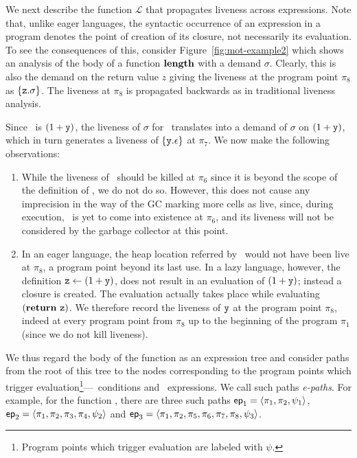 \documentclass[9pt]{sigplanconf}
\begin{document}
We next  describe the function $\mathcal{L}$  that propagates liveness
across expressions.  Note that,  unlike eager languages, the syntactic
occurrence  of an expression  in a  program denotes  the point  of
creation of its closure, not necessarily its evaluation.
To see the  consequences of this, consider
Figure~\ref{fig:mot-example2} which shows an analysis  of the body of
a function $\mathbf{length}$ with a demand $\sigma$.  Clearly, this is also the
demand on the return value $z$ giving the liveness at the program point
$\pi_8$ as $\{\mbox{\tt z}.\sigma\}$.  The liveness at $\pi_8$ is propagated
backwards as in traditional liveness analysis.

Since   \pz\  is   $(1  +   \mbox{\tt y})$,  the   liveness  of   $\sigma$  for
\pz\ translates into a demand  of $\sigma$ on $(1+\mbox{\tt y})$, which in turn
generates a  liveness of $\{\mbox{\tt y}.\epsilon\}$ at  $\pi_7$.  We now make
the following observations:
\begin{enumerate}
\item While the liveness of \py\  should be killed at $\pi_6$ since it
  is  beyond the scope  of the  definition of  \py, we  do not  do so.
  However, this  does not cause any  imprecision in the way  of the GC
  marking more cells as live,  since, during execution, \py\ is yet to
  come  into  existence at  $\pi_6$,  and  its  liveness will  not  be
  considered by the garbage collector at this point.
\item In an  eager language, the heap location referred  by \py\ would
  not have been live at $\pi_8$,  a program point beyond its last use.
  In  a  lazy  language,   however,  the  definition  $\mbox{\tt z}  \leftarrow
  (1+\mbox{\tt y})$, does not  result in an evaluation of  $(1+\mbox{\tt y})$; instead a
  closure  is  created.  The  evaluation  actually  takes place  while
  evaluating $(\mbox{$\mathbf{ return}$}~\mbox{\tt z})$.   We therefore  record the  liveness of
  $\mbox{\tt y}$ at  the program point  $\pi_8$, indeed at every  program point
  from $\pi_8$ up to the beginning of the program $\pi_1$ (since we do
  not kill liveness).
\end{enumerate}



We thus  regard the  body of  the function as  an expression  tree and
consider paths from  the root of this tree to  the nodes corresponding
to the program points which trigger evaluation\footnote{Program points
  which      trigger      evaluation       are      labeled      with
  $\psi$.}---\SIF\ conditions and \SRETURN\ expressions.  We call such
paths {\em e-paths}.  For example, for the function \length, there are
three  such paths  $\mathsf{ep}_1 =  \langle \pi_1,  \pi_2, \psi_1\rangle$,
$\mathsf{ep}_2  = \langle\pi_1,  \pi_2,  \pi_3,  \pi_4, \psi_2\rangle$  and
$\mathsf{ep}_3  =  \langle  \pi_1,   \pi_2,  \pi_5,  \pi_6,  \pi_7,  \pi_8,
\psi_3\rangle$.
\end{document}
